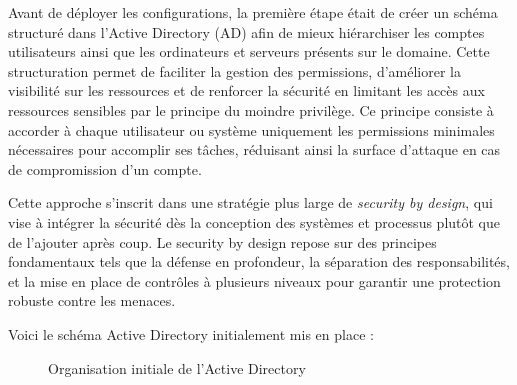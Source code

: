 \documentclass[a4paper, 11pt]{article}
\begin{document}
Avant de déployer les configurations, la première étape était de créer un schéma structuré dans l'Active Directory (AD) afin de mieux hiérarchiser les comptes 
utilisateurs ainsi que les ordinateurs et serveurs présents sur le domaine. Cette structuration permet de faciliter la gestion 
des permissions, d'améliorer la visibilité sur les ressources et de renforcer la sécurité en limitant les accès aux ressources sensibles
 par le principe du moindre privilège. Ce principe consiste à accorder à chaque utilisateur ou système uniquement les permissions minimales nécessaires pour accomplir ses tâches, réduisant ainsi la surface d'attaque en cas de compromission d'un compte. 
\par\bigskip

Cette approche s'inscrit dans une stratégie plus large de \textit{security by design}, qui vise à intégrer la sécurité dès la conception des 
systèmes et processus plutôt que de l'ajouter après coup. Le security by design repose sur des principes fondamentaux tels que la défense en 
profondeur, la séparation des responsabilités, et la mise en place de contrôles à plusieurs niveaux pour garantir une protection robuste contre les menaces.
\par\bigskip

Voici le schéma Active Directory initialement mis en place :\\


\begin{figure}[H]
\centering


\caption{Organisation initiale de l'Active Directory}
\end{figure}
\end{document}
